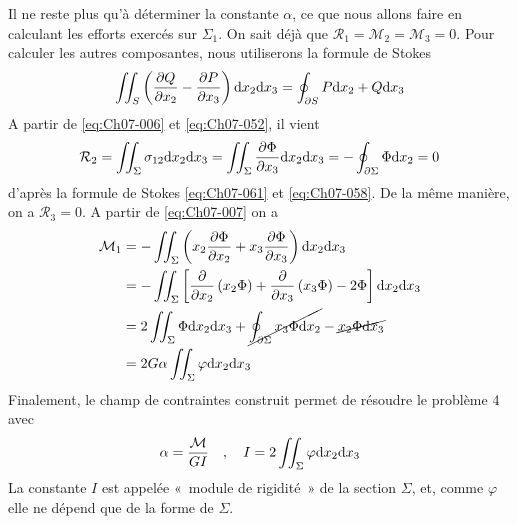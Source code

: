 Il ne reste plus qu'à déterminer la constante $\alpha$, ce que nous allons faire en calculant les efforts exercés sur $\Sigma_1$.
On sait déjà que $\mathcal{R}_1 = \mathcal{M}_2 = \mathcal{M}_3 = 0$.
Pour calculer les autres composantes, nous utiliserons la formule de Stokes
\begin{equation}
    \iint_{S} \left( \frac{\partial Q}{\partial x_2} - \frac{\partial P}{\partial x_3} \right) \mathrm{d} x_2 \mathrm{d} x_3 = \oint_{\partial S} P \mathrm{d} x_2 + Q \mathrm{d} x_3
    \label{eq:Ch07-061}
\end{equation}
A partir de \eqref{eq:Ch07-006} et \eqref{eq:Ch07-052}, il vient
\begin{equation}
    \mathcal{R}_2 = \iint_{\Sigma} \sigma_{12} \mathrm{d} x_2 \mathrm{d} x_3 = \iint_{\Sigma} \frac{\partial \Phi}{\partial x_3} \mathrm{d} x_2 \mathrm{d} x_3 = - \oint_{\partial \Sigma} \Phi \mathrm{d} x_2 = 0
    \label{eq:Ch07-062}
\end{equation}
d'après la formule de Stokes \eqref{eq:Ch07-061} et \eqref{eq:Ch07-058}.
De la même manière, on a $\mathcal{R}_3 = 0$.
A partir de \eqref{eq:Ch07-007} on a
\begin{equation}
    \begin{aligned}
        \mathcal{M}_1 &= -\iint_{\Sigma} \left( x_2 \frac{\partial \Phi}{\partial x_2} + x_3 \frac{\partial \Phi}{\partial x_3} \right) \mathrm{d} x_2 \mathrm{d} x_3 \\
        &= -\iint_{\Sigma} \left[ \frac{\partial}{\partial x_2} \left( x_2 \Phi \right) + \frac{\partial}{\partial x_3} \left( x_3 \Phi \right) - 2\Phi \right] \mathrm{d} x_2 \mathrm{d} x_3 \\
        &= 2 \iint_{\Sigma} \Phi \mathrm{d} x_2 \mathrm{d} x_3 + \cancel{\oint_{\partial \Sigma} x_3 \Phi \mathrm{d} x_2} - \cancel{x_2 \Phi \mathrm{d} x_3} \\
        &= 2 G \alpha \iint_{\Sigma} \varphi \mathrm{d} x_2 \mathrm{d} x_3
    \end{aligned}
    \label{eq:Ch07-063}
\end{equation}
Finalement, le champ de contraintes construit permet de résoudre le problème 4 avec
\begin{equation}
    \alpha = \frac{\mathcal{M}}{GI} \quad,\quad I = 2 \iint_{\Sigma} \varphi \mathrm{d} x_2 \mathrm{d} x_3
    \label{eq:Ch07-064} 
\end{equation}
La constante $I$ est appelée «~module de rigidité~» de la section $\Sigma$, et, comme $\varphi$ elle ne dépend que de la forme de $\Sigma$.

